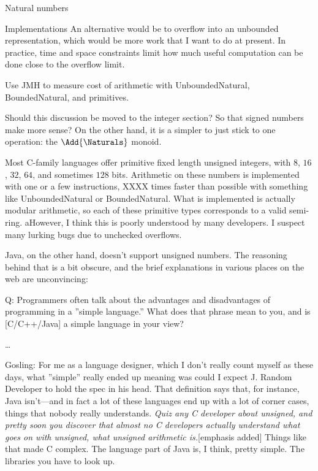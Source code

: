 \documentclass[12pt]{PalisadesLakesBook}
\begin{document}
\begin{plSection}{Natural numbers}
\begin{plSection}{Implementations}
An alternative would be to overflow into an unbounded 
representation, which would be more work that I want to do 
at present.
In practice, time and space constraints limit how much useful
computation can be done close to the overflow limit.

\TODO Use JMH to measure cost of arithmetic with
{\javaFont UnboundedNatural},
{\javaFont BoundedNatural},
and primitives.

\TODO Should this discussion be moved to the integer section?
So that signed numbers make more sense? On the other hand, 
it is a simpler to just stick to one operation:
the $\Add{\Naturals}$ monoid.


Most C-family languages offer primitive fixed length
unsigned integers, with $8$, $16$, $32$, $64$, and 
sometimes $128$ bits.
Arithmetic on these numbers is implemented with one or a few
instructions, XXXX times faster than possible with something
like {\javaFont UnboundedNatural} or
{\javaFont BoundedNatural}.
What is implemented is actually modular arithmetic,
so each of these primitive types corresponds to a valid
semi-ring.
aHowever, I think this is poorly understood by many developers.
I suspect many lurking bugs due to unchecked overflows.

Java, on the other hand, doesn't support unsigned numbers.
The reasoning behind that is a bit obscure,
and the brief explanations in various places on the web
are unconvincing:

\begin{plQuote}
{}{}%
{%
Q: Programmers often talk about the advantages and disadvantages 
of programming in a ''simple language.''  
What does that phrase mean to you, and is [C/C++/Java] 
a simple language in your view? 

\ldots

Gosling: For me as a language designer, 
which I don't really count myself as these days, 
what ''simple'' really ended up meaning was could I expect 
J. Random Developer to hold the spec in his head. 
That definition says that, for instance, Java isn't---and 
in fact a lot of these languages end up 
with a lot of corner cases, things that nobody really understands. 
\emph{Quiz any C developer about unsigned, 
and pretty soon you discover 
that almost no C developers actually understand what goes on 
with unsigned, what unsigned arithmetic is.}[emphasis added] 
Things like that made C complex. 
The language part of Java is, I think, pretty simple. 
The libraries you have to look up.}


\end{plQuote}
\end{plSection}
\end{plSection}
\end{document}
